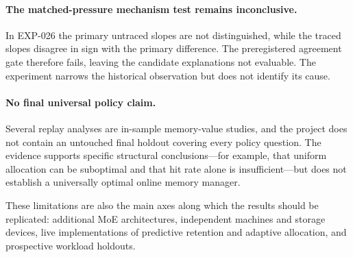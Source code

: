 \paragraph{The matched-pressure mechanism test remains inconclusive.}
In EXP-026 the primary untraced slopes are not distinguished, while the traced slopes disagree in sign with the primary difference. The preregistered agreement gate therefore fails, leaving the candidate explanations not evaluable. The experiment narrows the historical observation but does not identify its cause.

\paragraph{No final universal policy claim.}
Several replay analyses are in-sample memory-value studies, and the project does not contain an untouched final holdout covering every policy question. The evidence supports specific structural conclusions---for example, that uniform allocation can be suboptimal and that hit rate alone is insufficient---but does not establish a universally optimal online memory manager.

These limitations are also the main axes along which the results should be replicated: additional MoE architectures, independent machines and storage devices, live implementations of predictive retention and adaptive allocation, and prospective workload holdouts.
